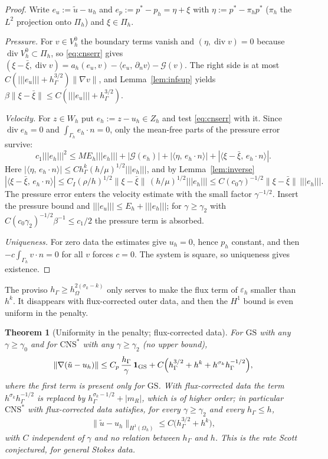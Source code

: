 \documentclass[pdflatex,sn-mathphys-num]{sn-jnl}
\theoremstyle{thmstyleone}
\newtheorem{theorem}{Theorem}[section]
\theoremstyle{thmstylethree}
\newcommand{\hG}{h_\Gamma}
\newcommand{\hO}{h_\Omega}
\newcommand{\Gh}{\Gamma_h}
\newcommand{\Oh}{\Omega_h}
\newcommand{\VO}{V_h^0}
\newcommand{\Pih}{\Pi_h}
\newcommand{\Zh}{Z_h}
\newcommand{\Wh}{W_h}
\newcommand{\dn}{\partial_n}
\newcommand{\ut}{\tilde u}
\newcommand{\ip}[2]{\langle #1,\, #2\rangle}
\newcommand{\tnorm}[1]{|\!|\!|#1|\!|\!|}
\newcommand{\norm}[1]{\lVert #1\rVert}
\newcommand{\GS}{\mathrm{GS}}
\newcommand{\CNS}{\mathrm{CNS}^\ast}
\newcommand{\eps}{\varepsilon_h}
\renewcommand{\div}{\operatorname{div}}
\newcommand{\Gc}{\mathcal G}
\begin{document}
\begin{proof}
Write $e_u:=\ut-u_h$ and $e_p:=p^\ast-p_h=\eta+\xi$ with $\eta:=p^\ast-\pi_hp^\ast$ ($\pi_h$ the $L^2$ projection onto $\Pih$) and $\xi\in\Pih$.

\emph{Pressure.} For $v\in\VO$ the boundary terms vanish and $(\eta,\div v)=0$ because $\div\VO\subset\Pih$, so \eqref{eq:cnserr} gives $(\xi-\bar\xi,\div v)=a_h(e_u,v)-\ip{e_u}{\dn v}-\Gc(v)$. The right side is at most $C(\tnorm{e_u}+\hG^{3/2})\norm{\nabla v}$, and Lemma~\ref{lem:infsup} yields $\beta\norm{\xi-\bar\xi}\le C(\tnorm{e_u}+\hG^{3/2})$.

\emph{Velocity.} For $z\in\Wh$ put $e_h:=z-u_h\in\Zh$ and test \eqref{eq:cnserr} with it. Since $\div e_h=0$ and $\int_{\Gh}e_h\cdot n=0$, only the mean-free parts of the pressure error survive:
\[
c_1\tnorm{e_h}^2\le ME_h\tnorm{e_h}+|\Gc(e_h)|+|\ip{\eta}{e_h\cdot n}|+|\ip{\xi-\bar\xi}{e_h\cdot n}| .
\]
Here $|\ip{\eta}{e_h\cdot n}|\le C\hG^k(h/\mu)^{1/2}\tnorm{e_h}$, and by Lemma~\ref{lem:inverse}
\[
|\ip{\xi-\bar\xi}{e_h\cdot n}|\le C_I(\rho/h)^{1/2}\norm{\xi-\bar\xi}\,(h/\mu)^{1/2}\tnorm{e_h}\le C(c_0\gamma)^{-1/2}\norm{\xi-\bar\xi}\,\tnorm{e_h}.
\]
The pressure error enters the velocity estimate with the small factor $\gamma^{-1/2}$. Insert the pressure bound and $\tnorm{e_u}\le E_h+\tnorm{e_h}$; for $\gamma\ge\gamma_2$ with $C(c_0\gamma_2)^{-1/2}\beta^{-1}\le c_1/2$ the pressure term is absorbed.

\emph{Uniqueness.} For zero data the estimates give $u_h=0$, hence $p_h$ constant, and then $-c\int_{\Gh}v\cdot n=0$ for all $v$ forces $c=0$. The system is square, so uniqueness gives existence.
\end{proof}

The proviso $\hG\ge\hO^{2(\sigma_k-k)}$ only serves to make the flux term of $\eps$ smaller than $h^k$. It disappears with flux-corrected outer data, and then the $H^1$ bound is even uniform in the penalty.

\begin{theorem}[Uniformity in the penalty; flux-corrected data]\label{thm:unif}
For $\GS$ with any $\gamma\ge\gamma_0$ and for $\CNS$ with any $\gamma\ge\gamma_2$ (no upper bound),
\[
\norm{\nabla(\ut-u_h)}\le C_p\,\frac{\hG}{\gamma}\,\mathbf 1_{\GS}+C\Bigl(\hG^{3/2}+h^k+h^{\sigma_k}\hG^{-1/2}\Bigr),
\]
where the first term is present only for $\GS$. With flux-corrected data the term $h^{\sigma_k}\hG^{-1/2}$ is replaced by $\hG^{\sigma_k-1/2}+|m_R|$, which is of higher order; in particular $\CNS$ with flux-corrected data satisfies, for every $\gamma\ge\gamma_2$ and every $\hG\le h$,
\[
\norm{\ut-u_h}_{H^1(\Oh)}\le C\bigl(\hG^{3/2}+h^k\bigr),
\]
with $C$ independent of $\gamma$ and no relation between $\hG$ and $h$. This is the rate Scott conjectured, for general Stokes data.
\end{theorem}
\end{document}
